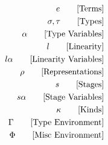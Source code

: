 \documentclass {article}
\begin{document}
\Large

\begin{align*}
e \tag* {[Terms]}\\
\sigma, \tau \tag* {[Types]} \\
\alpha \tag* {[Type Variables]} \\
l \tag* {[Linearity]} \\
l \alpha \tag* {[Linearity Variables]} \\
\rho \tag* {[Representations]} \\
s \tag* {[Stages]} \\
s \alpha \tag* {[Stage Variables]} \\
\kappa \tag* {[Kinds]} \\
\Gamma \tag* {[Type Environment]} \\
\Phi \tag* {[Misc Environment]}
\end{align*}
\end{document}
